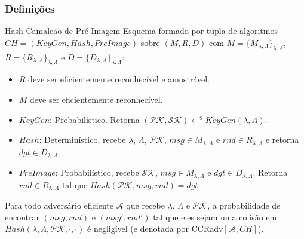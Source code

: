 \documentclass{beamer}
\begin{document}
\begin{frame}
\frametitle{Definições}

\begin{block}{Hash Camaleão de Pré-Imagem}
    Esquema formado por tupla de algoritmos $CH=(KeyGen, Hash, PreImage)$ sobre $(M, R, D)$ com $M=\{M_{\lambda,\Lambda}\}_{\lambda, \Lambda}$, $R=\{R_{\lambda,\Lambda}\}_{\lambda, \Lambda}$ e $D=\{D_{\lambda,\Lambda}\}_{\lambda, \Lambda}$:
    \begin{itemize}
    \item $R$ deve ser eficientemente reconhecível e amostrável.
    \item $M$ deve ser eficientemente reconhecível.
        \item $KeyGen$: Probabilístico. Retorna $(\mathcal{PK}, \mathcal{SK})\leftarrow^{\$}KeyGen(\lambda,\Lambda)$.
        \item $Hash$: Determinístico, recebe $\lambda$, $\Lambda$, $\mathcal{PK}$, $msg\in M_{\lambda,\Lambda}$ e $rnd\in R_{\lambda,\Lambda}$ e retorna $dgt \in D_{\lambda,\Lambda}$
        \item $PreImage$: Probabilístico, recebe $\mathcal{SK}$, $msg \in M_{\lambda,\Lambda}$ e $dgt \in D_{\lambda,\Lambda}$. Retorna $rnd \in R_{\lambda,\Lambda}$ tal que $Hash(\mathcal{PK}, msg, rnd)=dgt$.
    \end{itemize}
    Para todo adversário eficiente $\mathcal{A}$ que recebe $\lambda$, $\Lambda$ e $\mathcal{PK}$, a probabilidade de encontrar $(msg, rnd)$ e $(msg', rnd')$ tal que eles sejam uma colisão em $Hash(\lambda, \Lambda, \mathcal{PK}, \cdot, \cdot)$ é negligível (e denotada por CCRadv$[\mathcal{A}, CH]$).
    \end{block}
\end{frame}
\end{document}
